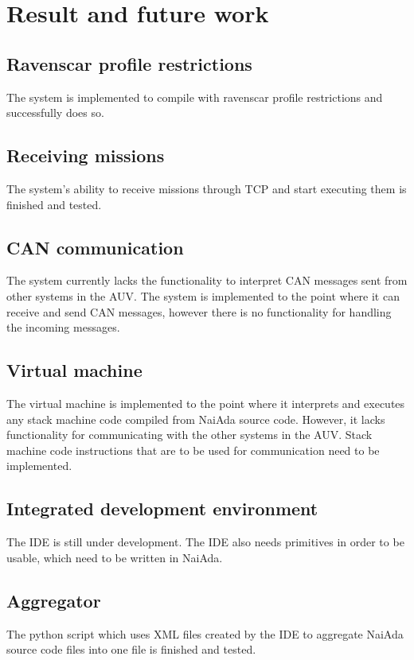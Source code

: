 \section{Result and future work}\label{sec:result}

\subsection{Ravenscar profile restrictions}
The system is implemented to compile with ravenscar profile restrictions \cite{article:mcsraven} and successfully does so.

\subsection{Receiving missions}
The system's ability to receive missions through TCP and start executing them is finished and tested.

\subsection{CAN communication}
The system currently lacks the functionality to interpret CAN messages sent from other systems in the AUV. The system is implemented to the point where it can receive and send CAN messages, however there is no functionality for handling the incoming messages.

\subsection{Virtual machine}
The virtual machine is implemented to the point where it interprets and executes any stack machine code compiled from NaiAda source code. However, it lacks functionality for communicating with the other systems in the AUV. Stack machine code instructions that are to be used for communication need to be implemented.

\subsection{Integrated development environment}
The IDE is still under development. The IDE also needs primitives in order to be usable, which need to be written in NaiAda.

\subsection{Aggregator}
The python script which uses XML files created by the IDE to aggregate NaiAda source code files into one file is finished and tested.

